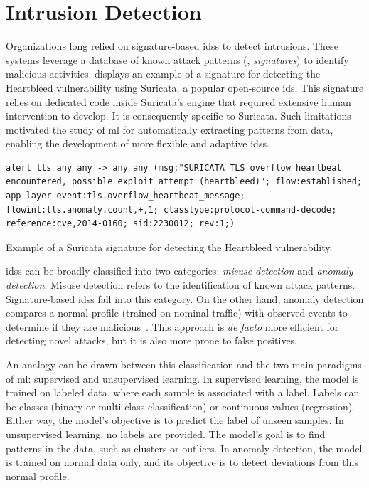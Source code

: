 
\section{Intrusion Detection\label{sec:bg.ids}}

Organizations long relied on signature-based \glspl{ids} to detect intrusions.
These systems leverage a database of known attack patterns (\ie, \emph{signatures}) to identify malicious activities.
 displays an example of a signature for detecting the Heartbleed vulnerability using Suricata, a popular open-source \gls{ids}.
This signature relies on dedicated code inside Suricata's engine that required extensive human intervention to develop.
It is consequently specific to Suricata.
Such limitations motivated the study of \gls{ml} for automatically extracting patterns from data, enabling the development of more flexible and adaptive \glspl{ids}.

\begin{listing}
  \begin{lstlisting}[gobble=4]
    alert tls any any -> any any (msg:"SURICATA TLS overflow heartbeat encountered, possible exploit attempt (heartbleed)"; flow:established; app-layer-event:tls.overflow_heartbeat_message; flowint:tls.anomaly.count,+,1; classtype:protocol-command-decode; reference:cve,2014-0160; sid:2230012; rev:1;)
  \end{lstlisting}
  \caption[
    Example of a Suricata signature for detecting the Heartbleed vulnerability.
  ]{
    Example of a Suricata signature for detecting the Heartbleed vulnerability\footnotemark{}.
    \label{lst:suricata} 
  }
\end{listing}


\Glspl{ids} can be broadly classified into two categories: \emph{misuse detection} and \emph{anomaly detection}.
Misuse detection refers to the identification of known attack patterns.
Signature-based \glspl{ids} fall into this category.
On the other hand, anomaly detection compares a normal profile (trained on nominal traffic) with observed events to determine if they are malicious~\cite{garcia-teodoro_Anomalybasednetworkintrusion_2009}.
This approach is \emph{de facto} more efficient for detecting novel attacks, but it is also more prone to false positives.

An analogy can be drawn between this classification and the two main paradigms of \gls{ml}: supervised and unsupervised learning.
In supervised learning, the model is trained on labeled data, where each sample is associated with a label.
Labels can be classes (binary or multi-class classification) or continuous values (regression).
Either way, the model's objective is to predict the label of unseen samples.
In unsupervised learning, no labels are provided.
The model's goal is to find patterns in the data, such as clusters or outliers.
In anomaly detection, the model is trained on normal data only, and its objective is to detect deviations from this normal profile.

